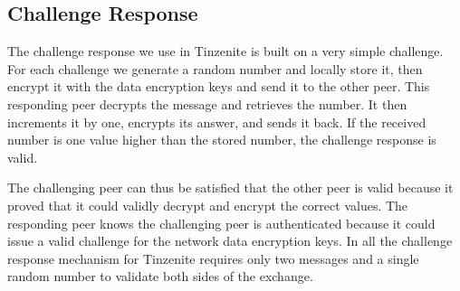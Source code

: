 \subsection{Challenge Response}
\label{sub:Challenge Response}

The challenge response we use in Tinzenite is built on a very simple challenge.
For each challenge we generate a random number and locally store it, then encrypt it with the data encryption keys and send it to the other peer.
This responding peer decrypts the message and retrieves the number.
It then increments it by one, encrypts its answer, and sends it back.
If the received number is one value higher than the stored number, the challenge response is valid.

The challenging peer can thus be satisfied that the other peer is valid because it proved that it could validly decrypt and encrypt the correct values.
The responding peer knows the challenging peer is authenticated because it could issue a valid challenge for the network data encryption keys.
In all the challenge response mechanism for Tinzenite requires only two messages and a single random number to validate both sides of the exchange.
